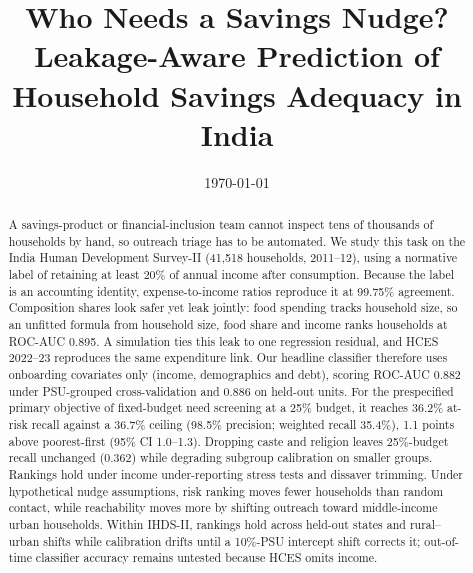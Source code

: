 \documentclass[conference]{IEEEtran}
\begin{document}
\title{Who Needs a Savings Nudge? Leakage-Aware Prediction of\\Household Savings Adequacy in India}

\author{
}

\date{\today}

\maketitle

\begin{abstract}
A savings-product or financial-inclusion team cannot inspect tens of thousands of households by hand, so outreach triage has to be automated. We study this task on the India Human Development Survey-II (41,518 households, 2011--12), using a normative label of retaining at least 20\% of annual income after consumption. Because the label is an accounting identity, expense-to-income ratios reproduce it at 99.75\% agreement. Composition shares look safer yet leak jointly: food spending tracks household size, so an unfitted formula from household size, food share and income ranks households at ROC-AUC 0.895. A simulation ties this leak to one regression residual, and HCES 2022--23 reproduces the same expenditure link. Our headline classifier therefore uses onboarding covariates only (income, demographics and debt), scoring ROC-AUC 0.882 under PSU-grouped cross-validation and 0.886 on held-out units. For the prespecified primary objective of fixed-budget need screening at a 25\% budget, it reaches 36.2\% at-risk recall against a 36.7\% ceiling (98.5\% precision; weighted recall 35.4\%), 1.1 points above poorest-first (95\% CI 1.0--1.3). Dropping caste and religion leaves 25\%-budget recall unchanged (0.362) while degrading subgroup calibration on smaller groups. Rankings hold under income under-reporting stress tests and dissaver trimming. Under hypothetical nudge assumptions, risk ranking moves fewer households than random contact, while reachability moves more by shifting outreach toward middle-income urban households. Within IHDS-II, rankings hold across held-out states and rural--urban shifts while calibration drifts until a 10\%-PSU intercept shift corrects it; out-of-time classifier accuracy remains untested because HCES omits income.
\end{abstract}
\end{document}

